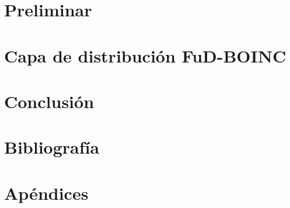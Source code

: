 \documentclass[12pt,spanish,a4paper]{report}
\begin{document}
	
	
	\tableofcontents
	\listoffigures 
	\lstlistoflistings
    \listoftables
	
	\newpage
	
	\part{Preliminar}\label{prelim}
		
		
			
	\part{Capa de distribución FuD-BOINC}\label{BOINC}
		
		
		
		
		
	\part{Conclusión}\label{conclusion}
		
		
		
	\part{Bibliografía}
	\label{biblio}
	    \nocite{*}
	    
	    

    \part{Apéndices}
        \appendix \label{appendix}
        
 
\end{document}
